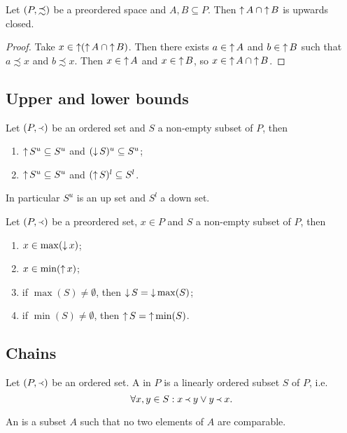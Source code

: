 \begin{lemma} \label{intersectionUpwardsClosedIsUpwardsClosed}
Let $\left( P, \precsim \right)$ be a preordered space and $A,B\subseteq P$. Then $\operatorname{\uparrow} A \cap \operatorname{\uparrow} B$ is upwards closed.
\end{lemma}
\begin{proof}
Take $x\in \operatorname{\uparrow}(\operatorname{\uparrow} A \cap \operatorname{\uparrow} B)$. Then there exists $a\in \operatorname{\uparrow} A$ and $b\in \operatorname{\uparrow} B$ such that $a\precsim x$ and $b\precsim x$. Then $x\in \operatorname{\uparrow} A$ and $x\in \operatorname{\uparrow} B$, so $x\in \operatorname{\uparrow} A \cap \operatorname{\uparrow} B$.
\end{proof}


\subsection{Upper and lower bounds}

\begin{lemma} \label{upperBoundUpsetLowerBoundDownset}
Let $(P,\Yleft)$ be an ordered set and $S$ a non-empty subset of $P$, then
\begin{enumerate}
\item $\operatorname{\uparrow} S^u \subseteq S^u$ and $(\operatorname{\downarrow} S)^u \subseteq S^u$;
\item $\operatorname{\uparrow} S^u \subseteq S^u$ and $(\operatorname{\uparrow} S)^l \subseteq S^l$.
\end{enumerate}
\end{lemma}
In particular $S^u$ is an up set and $S^l$ a down set.
\begin{corollary} \label{minMaxUpsetDownset}
Let $(P,\Yleft)$ be a preordered set, $x\in P$ and $S$ a non-empty subset of $P$, then
\begin{enumerate}
\item $x \in \max(\operatorname{\downarrow} x)$;
\item $x \in \min(\operatorname{\uparrow} x)$;
\item if $\max(S)\neq \emptyset$, then $\operatorname{\downarrow} S = \operatorname{\downarrow} \max(S)$;
\item if $\min(S)\neq \emptyset$, then $\operatorname{\uparrow} S = \operatorname{\uparrow} \min(S)$.
\end{enumerate}
\end{corollary}



\subsection{Chains}
\begin{definition}
Let $(P,\Yleft)$ be an ordered set. A  in $P$ is a linearly ordered subset $S$ of $P$, i.e.\
\[ \forall x,y\in S: x\Yleft y \lor y\Yleft x. \]

An  is a subset $A$ such that no two elements of $A$ are comparable.
\end{definition}

